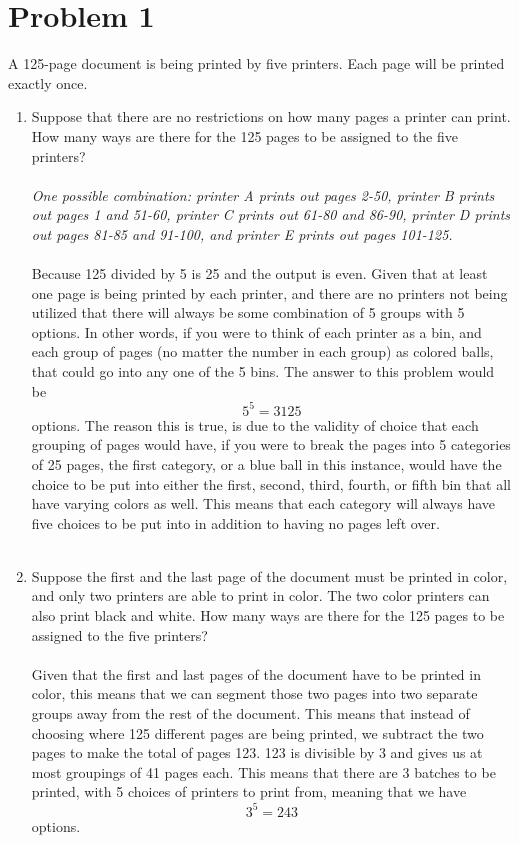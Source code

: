 \section*{Problem 1}

A 125-page document is being printed by five printers. Each page will be printed exactly once.
 \begin{enumerate}[label=(\alph*)]
 \item  Suppose that there are no restrictions on how many pages a printer can print. How many ways are there for the 125 pages to be assigned to the five printers?\\\\
{\it One possible combination: printer A prints out pages 2-50, printer B prints out pages 1 and 51-60, printer C prints out 61-80 and 86-90, printer D prints out pages 81-85 and 91-100, and printer E prints out pages 101-125.}\\\\
Because 125 divided by 5 is 25 and the output is even. Given that at least one page is being printed by each printer, and there are no printers not being utilized that there will always be some combination of 5 groups with 5 options. In other words, if you were to think of each printer as a bin, and each group of pages (no matter the number in each group) as colored balls, that could go into any one of the 5 bins. The answer to this problem would be \[5^5 = 3125\] options. The reason this is true, is due to the validity of choice that each grouping of pages would have, if you were to break the pages into 5 categories of 25 pages, the first category, or a blue ball in this instance, would have the choice to be put into either the first, second, third, fourth, or fifth bin that all have varying colors as well. This means that each category will always have five choices to be put into in addition to having no pages left over.
        \\\\
 \item Suppose the first and the last page of the document must be printed in color, and only two printers are able to print in color. The two color printers can also print black and white. How many ways are there for the 125 pages to be assigned to the five printers?\\\\
Given that the first and last pages of the document have to be printed in color, this means that we can segment those two pages into two separate groups away from the rest of the document. This means that instead of choosing where 125 different pages are being printed, we subtract the two pages to make the total of pages 123. 123 is divisible by 3 and gives us at most groupings of 41 pages each. This means that there are 3 batches to be printed, with 5 choices of printers to print from, meaning that we have \[3^5 = 243\] options.

\end{enumerate}
